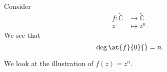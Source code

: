 \begin{eg}[Degree of \(z^n\)]
	Consider
	\[
		\begin{split}
			f\colon \widetilde{\mathbb{C}} & \to \widetilde{\mathbb{C}} \\
			z                              & \mapsto z^n.
		\end{split}
	\]
	We see that
	\[
		\deg \at{f}{0}{} = n.
	\]
\end{eg}
\begin{explanation}
	We look at the illustration of \(f(z) = z^n\).
	\begin{figure}[H]
		\centering
		\label{fig:eg:lec31-degree-n}
	\end{figure}
\end{explanation}